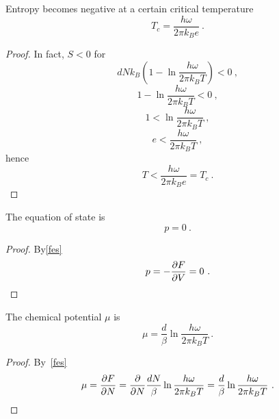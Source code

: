     Entropy becomes negative at a certain critical temperature
    \begin{equation*}
        T_c = \frac{h \omega}{2 \pi k_B e} ~.
    \end{equation*}
    \begin{proof}
        In fact, $S < 0$ for 
        \begin{equation*}
            d N k_B (1 - \ln \frac{h \omega}{2 \pi k_B T}) < 0 ~,
        \end{equation*}
        \begin{equation*}
            1 - \ln \frac{h \omega}{2 \pi k_B T} < 0 ~,
        \end{equation*}
        \begin{equation*}
            1 < \ln \frac{h \omega}{2 \pi k_B T} ~,
        \end{equation*}
        \begin{equation*}
            e < \frac{h \omega}{2 \pi k_B T}  ~,
        \end{equation*}
        hence 
        \begin{equation*}
            T < \frac{h \omega}{2 \pi k_B e} = T_c ~.
        \end{equation*}
    \end{proof}
    
    The equation of state is 
    \begin{equation}\label{idesharm}
        p = 0 ~.
    \end{equation}
    \begin{proof}
        By\eqref{fes}
        \begin{equation*}
            p = - \frac{\partial F}{\partial V} = 0 ~.
        \end{equation*}
    \end{proof}
    
    The chemical potential $\mu$ is 
    \begin{equation*}
        \mu = \frac{d}{\beta} \ln \frac{h \omega}{2 \pi k_B T} ~.
    \end{equation*}
    \begin{proof}
        By~\eqref{fes}
        \begin{equation*}
            \mu = \frac{\partial F}{\partial N} = \frac{\partial}{\partial N} \frac{dN}{\beta} \ln \frac{h \omega}{2 \pi k_B T} = \frac{d}{\beta} \ln \frac{h \omega}{2 \pi k_B T} ~.
        \end{equation*}
    \end{proof}

